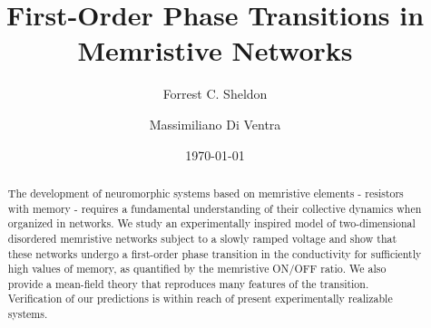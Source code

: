 \documentclass[aps,prl,reprint,groupedaddress]{revtex4-1}
\begin{document}

\title{First-Order Phase Transitions in Memristive Networks}


\author{Forrest C. Sheldon}


\author{Massimiliano Di Ventra}


\date{\today}

\begin{abstract}
The development of neuromorphic systems based on memristive elements - resistors with memory
- requires a fundamental understanding of their collective dynamics when organized in networks.
We study an experimentally
inspired model of two-dimensional disordered memristive networks subject to a slowly
ramped voltage and show that these networks undergo a
first-order phase transition in the conductivity for sufficiently high
values of memory, as quantified by the memristive ON/OFF ratio. We also
provide a mean-field theory
that reproduces many features of the transition. Verification of our predictions is within reach of 
present experimentally realizable systems.
\end{abstract}
\end{document}
